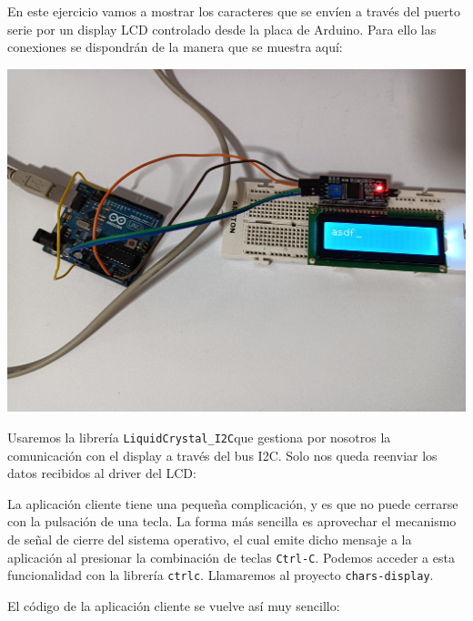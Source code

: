 En este ejercicio vamos a mostrar los caracteres que se envíen a través del
puerto serie por un display LCD controlado desde la placa de Arduino. Para ello
las conexiones se dispondrán de la manera que se muestra aquí:

\includegraphics[width=\linewidth]{chars-display-wiring.jpg}

Usaremos la librería \verb|LiquidCrystal_I2C|\footnotemark que gestiona por
nosotros la comunicación con el display a través del bus I2C. Solo nos queda
reenviar los datos recibidos al driver del LCD:




La aplicación cliente tiene una pequeña complicación, y es que no puede
cerrarse con la pulsación de una tecla. La forma más sencilla es aprovechar
el mecanismo de señal de cierre del sistema operativo, el cual emite dicho
mensaje a la aplicación al presionar la combinación de teclas \verb|Ctrl-C|.
Podemos acceder a esta funcionalidad con la librería \verb|ctrlc|. Llamaremos
al proyecto \verb|chars-display|.



El código de la aplicación cliente se vuelve así muy sencillo:

